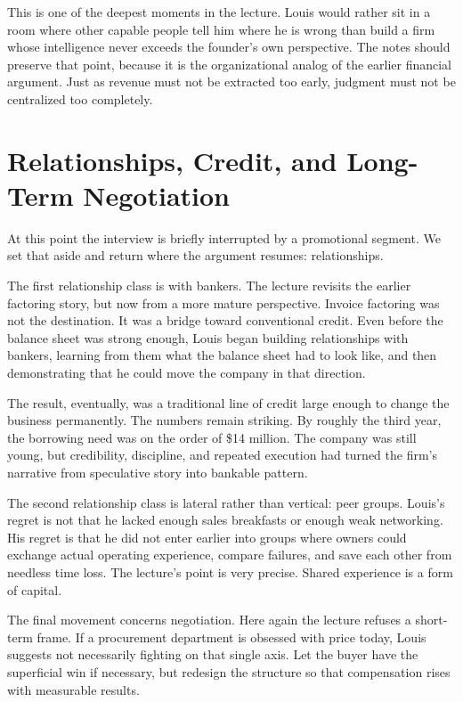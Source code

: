 This is one of the deepest moments in the lecture. Louis would rather sit in a room where other capable people tell him where he is wrong than build a firm whose intelligence never exceeds the founder's own perspective. The notes should preserve that point, because it is the organizational analog of the earlier financial argument. Just as revenue must not be extracted too early, judgment must not be centralized too completely.

\section{Relationships, Credit, and Long-Term Negotiation}

At this point the interview is briefly interrupted by a promotional segment. We set that aside and return where the argument resumes: relationships.

The first relationship class is with bankers. The lecture revisits the earlier factoring story, but now from a more mature perspective. Invoice factoring was not the destination. It was a bridge toward conventional credit. Even before the balance sheet was strong enough, Louis began building relationships with bankers, learning from them what the balance sheet had to look like, and then demonstrating that he could move the company in that direction.

The result, eventually, was a traditional line of credit large enough to change the business permanently. The numbers remain striking. By roughly the third year, the borrowing need was on the order of \$14 million. The company was still young, but credibility, discipline, and repeated execution had turned the firm's narrative from speculative story into bankable pattern.

The second relationship class is lateral rather than vertical: peer groups. Louis's regret is not that he lacked enough sales breakfasts or enough weak networking. His regret is that he did not enter earlier into groups where owners could exchange actual operating experience, compare failures, and save each other from needless time loss. The lecture's point is very precise. Shared experience is a form of capital.

The final movement concerns negotiation. Here again the lecture refuses a short-term frame. If a procurement department is obsessed with price today, Louis suggests not necessarily fighting on that single axis. Let the buyer have the superficial win if necessary, but redesign the structure so that compensation rises with measurable results.

